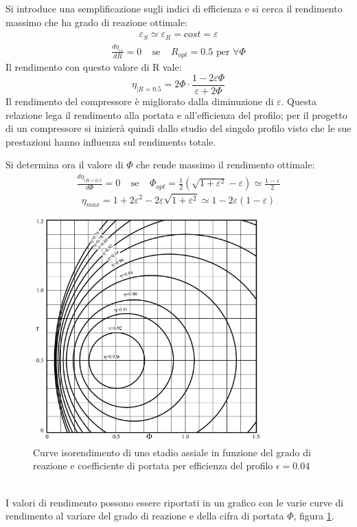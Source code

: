 Si introduce una semplificazione sugli indici di efficienza e si cerca il rendimento massimo che ha grado di reazione ottimale:
\begin{align*}
\varepsilon_S \simeq \varepsilon_R = cost = \varepsilon
\end{align*}
\begin{align*}
\frac{d \eta_{is}}{dR} = 0 \;\;\;\; \text{se}  \;\;\;\; R_{opt} = 0.5 \mbox{ per } \forall \Phi
\end{align*}
Il rendimento con questo valore di R vale:
\begin{equation}
\eta_{|R= 0.5} = 2 \Phi \cdot \frac{1- 2 \varepsilon \Phi}{\varepsilon + 2 \Phi}
\end{equation}
Il rendimento del compressore è migliorato dalla diminuzione di $\varepsilon$. Questa relazione lega il rendimento alla portata e all'efficienza del profilo; per il progetto di un compressore si inizierà quindi dallo studio del singolo profilo visto che le sue prestazioni hanno influenza sul rendimento totale.

Si determina ora il valore di $\Phi$ che rende massimo il rendimento ottimale:
\begin{align*}
\frac{d\eta_{|R=0.5}}{d \Phi} = 0 \;\;\;\; \text{se} \;\;\;\; \Phi_{opt} = \frac{1}{2} \left( \sqrt{1 + \varepsilon^2} - \varepsilon \right) \simeq \frac{1 - \varepsilon}{2}
\end{align*}
\begin{equation}
\eta_{max} = 1 + 2 \varepsilon^2 - 2 \varepsilon \sqrt{1 + \varepsilon^2} \simeq 1 - 2 \varepsilon \left( 1 - \varepsilon \right)
\end{equation}
\begin{figure}[h!]
\centering
  \includegraphics[width=0.8\textwidth]{fig/IsoRendCompAss.pdf}
\caption{Curve isorendimento di uno stadio assiale in funzione del grado di reazione e coefficiente di portata per efficienza del profilo $\epsilon=0.04$}
\label{fig:isorendimento}
\end{figure}
\\I valori di rendimento possono essere riportati in un grafico con le varie curve di rendimento al variare del grado di reazione e della cifra di portata $\Phi$, figura \ref{fig:isorendimento}.

